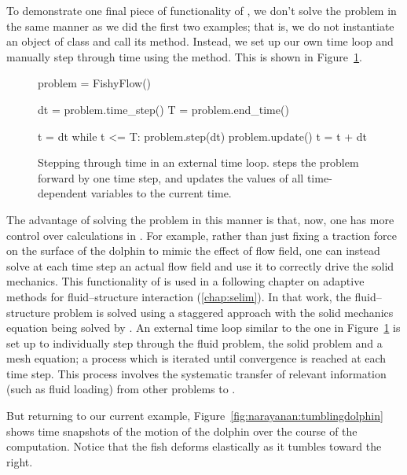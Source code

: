 To demonstrate one final piece of functionality of \twist, we don't
solve the problem in the same manner as we did the first two examples;
that is, we do not instantiate an object of class  and
call its  method. Instead, we set up our own time loop
and manually step through time using the  method. This is
shown in Figure~\ref{code:narayanan:manualstep}.

\begin{figure}
\begin{python}
problem = FishyFlow()

dt = problem.time_step()
T = problem.end_time()

t = dt
while t <= T:
    problem.step(dt)
    problem.update()
    t = t + dt
\end{python}
\caption{Stepping through time in an external time loop. 
  steps the problem forward by one time step, and 
  updates the values of all time-dependent variables to the current time.}
\label{code:narayanan:manualstep}
\end{figure}

The advantage of solving the problem in this manner is that, now, one
has more control over calculations in \twist{}. For example, rather
than just fixing a traction force on the surface of the dolphin to
mimic the effect of flow field, one can instead solve at each time
step an actual flow field and use it to correctly drive the solid
mechanics. This functionality of \twist{} is used in a following
chapter on adaptive methods for fluid--structure interaction
(\ref{chap:selim}). In that work, the fluid--structure problem is
solved using a staggered approach with the solid mechanics equation
being solved by \twist. An external time loop similar to the one in
Figure~\ref{code:narayanan:manualstep} is set up to individually step
through the fluid problem, the solid problem and a mesh equation; a
process which is iterated until convergence is reached at each time
step. This process involves the systematic transfer of relevant
information (such as fluid loading) from other problems to \twist.

But returning to our current example,
Figure~\ref{fig:narayanan:tumblingdolphin} shows time snapshots of the
motion of the dolphin over the course of the computation. Notice that
the fish deforms elastically as it tumbles toward the right.

